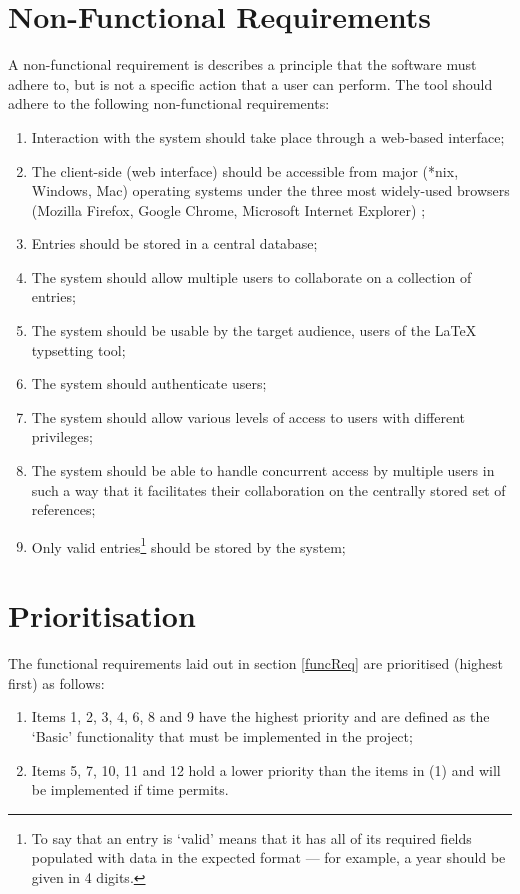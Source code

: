 \section{Non-Functional Requirements}
\label{nfReq}
A non-functional requirement is describes a principle that the software must adhere to, but is not a specific action that a user can perform.  The tool should adhere to the following non-functional requirements:
\begin{enumerate}
\item Interaction with the system should take place through a web-based interface;
\item The client-side (web interface) should be accessible from major (*nix, Windows, Mac) operating systems under the three most widely-used browsers (Mozilla Firefox, Google Chrome, Microsoft Internet Explorer) \cite{w3cBrowserStats};
\item Entries should be stored in a central database;
\item The system should allow multiple users to collaborate on a collection of \bibtex{} entries;
\item The system should be usable by the target audience, users of the \LaTeX{} typsetting tool;
\item The system should authenticate users;
\item The system should allow various levels of access to users with different
privileges;
\item The system should be able to handle concurrent access by multiple users in such a way that it facilitates their collaboration on the centrally stored set of references;
\item Only valid entries\footnote{To say that an entry is `valid' means that it has all of its required fields populated with data in the expected format --- for example, a year should be given in 4 digits.} should be stored by the system;
\end{enumerate}

\section{Prioritisation}
The functional requirements laid out in section \ref{funcReq} are prioritised (highest first) as follows:
\begin{enumerate}
	\item Items 1, 2, 3, 4, 6, 8 and 9 have the highest priority and are defined as the `Basic' functionality that must be implemented in the project;
	\item Items 5, 7, 10, 11 and 12 hold a lower priority than the items in (1) and will be implemented if time permits.
\end{enumerate}

